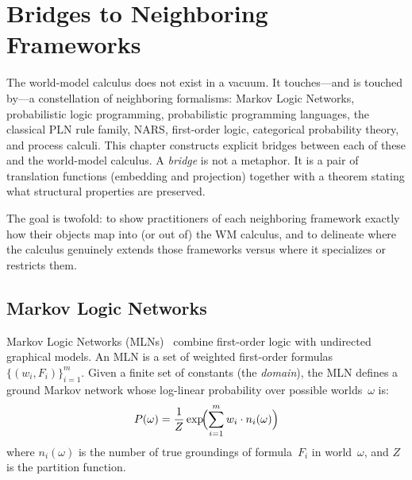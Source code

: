 \chapter{Bridges to Neighboring Frameworks}
\label{ch:bridges}

The world-model calculus does not exist in a vacuum.  It touches---and is
touched by---a constellation of neighboring formalisms: Markov Logic
Networks, probabilistic logic programming, probabilistic programming
languages, the classical PLN rule family,
NARS, first-order logic, categorical probability theory, and process
calculi.  This chapter constructs explicit bridges between each of these
and the world-model calculus.  A \emph{bridge} is not a metaphor.  It is a
pair of translation functions (embedding and projection) together with a
theorem stating what structural properties are preserved.

The goal is twofold: to show practitioners of each neighboring framework
exactly how their objects map into (or out of) the WM calculus, and to
delineate where the calculus genuinely extends those frameworks versus
where it specializes or restricts them.



\section{Markov Logic Networks}
\label{sec:bridge-mln}

Markov Logic Networks (MLNs)~\cite{richardson2006markov} combine
first-order logic with undirected graphical models.  An MLN is a set of
weighted first-order formulas $\{(w_i, F_i)\}_{i=1}^m$.  Given a finite
set of constants (the \emph{domain}), the MLN defines a ground Markov
network whose log-linear probability over possible worlds~$\omega$ is:
\[
  P(\omega) = \frac{1}{Z} \exp\!\Bigl(\sum_{i=1}^m w_i \cdot n_i(\omega)\Bigr)
\]
where $n_i(\omega)$ is the number of true groundings of formula~$F_i$ in
world~$\omega$, and $Z$ is the partition function.

